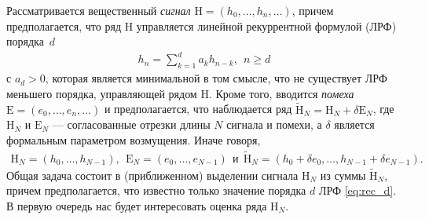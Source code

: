 \documentclass[specialist,
substylefile = spbu_report.rtx,
subf,href,colorlinks=true, 12pt]{disser}
\begin{document}
	Рассматривается вещественный \emph{сигнал} $\mathrm{H}=(h_0,\ldots, h_n,\ldots)$, причем предполагается, что ряд $\mathrm{H}$ управляется линейной
	рекуррентной формулой  (ЛРФ) порядка~$d$
	\begin{gather}
		\label{eq:rec_d}
		h_n = \sum\limits_{k=1}^d a_kh_{n-k}, \ \ n \geqslant d
	\end{gather}
	с $a_d>0$, которая является минимальной в том смысле, что  не существует ЛРФ меньшего порядка, управляющей рядом $\mathrm{H}$.
	Кроме того, вводится \emph{помеха} $\mathrm{E}=(e_0,\ldots, e_n,\ldots)$ и предполагается, что наблюдается ряд $\widetilde{\mathrm{H}}_N=\mathrm{H}_N+\delta
	\mathrm{E}_N$, где  $\mathrm{H}_N$ и $\mathrm{E}_N$ --- согласованные отрезки длины $N$ сигнала и помехи, а
	$\delta$ является формальным параметром возмущения. Иначе говоря,
	\begin{gather*}
		\mathrm{H}_N=(h_0, \ldots, h_{N-1}), \ \ \mathrm{E}_N=(e_0, \ldots, e_{N-1}) \ \ \text{и}\ \
		\widetilde{\mathrm{H}}_N=(h_0+\delta e_0, \ldots, h_{N-1}+\delta e_{N-1}).
	\end{gather*}
	Общая задача состоит в (приближенном) выделении сигнала $\mathrm{H}_N$ из суммы $\widetilde{\mathrm{H}}_N$, причем предполагается, что известно только
	значение порядка $d$ ЛРФ \eqref{eq:rec_d}.
	В первую очередь нас будет интересовать оценка ряда $\mathrm{H}_N$.
\end{document}

